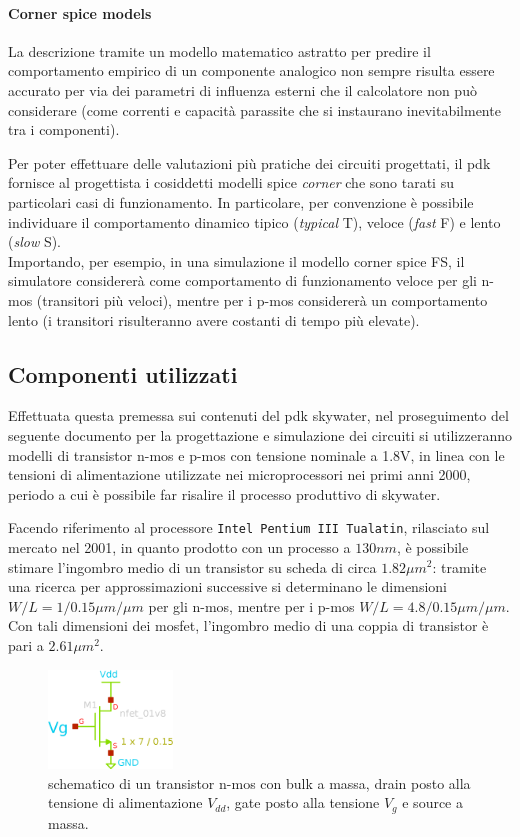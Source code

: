 		\paragraph{Corner spice models} La descrizione tramite un modello matematico astratto per predire il comportamento empirico di un componente analogico non sempre risulta essere accurato per via dei parametri di influenza esterni che il calcolatore non può considerare (come correnti e capacità parassite che si instaurano inevitabilmente tra i componenti).
		
		Per poter effettuare delle valutazioni più pratiche dei circuiti progettati, il pdk fornisce al progettista i cosiddetti modelli spice \textit{corner} che sono tarati su particolari casi di funzionamento. In particolare, per convenzione è possibile individuare il comportamento dinamico tipico (\textit{typical} T), veloce (\textit{fast} F) e lento (\textit{slow} S).\\
		Importando, per esempio, in una simulazione il modello corner spice FS, il simulatore considererà come comportamento di funzionamento veloce per gli n-mos (transitori più veloci), mentre per i p-mos considererà un comportamento lento (i transitori risulteranno avere costanti di tempo più elevate).
		
	\subsection*{Componenti utilizzati}
		Effettuata questa premessa sui contenuti del pdk skywater, nel proseguimento del seguente documento per la progettazione e simulazione dei circuiti si utilizzeranno modelli di transistor n-mos e p-mos con tensione nominale a 1.8V, in linea con le tensioni di alimentazione utilizzate nei microprocessori nei primi anni 2000, periodo a cui è possibile far risalire il processo produttivo di skywater. 
		
		Facendo riferimento al processore \texttt{Intel Pentium III Tualatin}, rilasciato sul mercato nel 2001, in quanto prodotto con un processo a $130nm$, è possibile stimare l'ingombro medio di un transistor su scheda di circa $1.82 \mu m^2$: tramite una ricerca per approssimazioni successive si determinano le dimensioni $W/L = 1/0.15 \mu m/\mu m$ per gli n-mos, mentre per i p-mos $W/L = 4.8/0.15 \mu m/\mu m$. Con tali dimensioni dei mosfet, l'ingombro medio di una coppia di transistor è pari a $2.61 \mu m^2$.
		
		\begin{figure}[bht]
			\centering
			\includegraphics[width=3.3cm]{Immagini/nmos.eps}
			\caption{schematico di un transistor n-mos con bulk a massa, drain posto alla tensione di alimentazione $V_{dd}$, gate posto alla tensione $V_g$ e source a massa.} \label{fig:intro:schematico-nmos}
		\end{figure}
	

